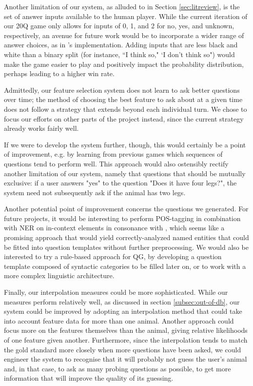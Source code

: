 \documentclass[11pt,a4paper]{article}
\begin{document}
Another limitation of our system, as alluded to in Section \ref{sec:litreview}, is the set of answer inputs available to the human player. While the current iteration of our 20Q game only allows for inputs of 0, 1, and 2 for no, yes, and unknown, respectively, an avenue for future work would be to incorporate a wider range of answer choices, as in \citet{Burgener2006}'s implementation. Adding inputs that are less black and white than a binary split (for instance, ``I think so," `I don't think so") would make the game easier to play and positively impact the probability distribution, perhaps leading to a higher win rate. 

Admittedly, our feature selection system does not learn to ask better questions over time; the method of choosing the best feature to ask about at a given time does not follow a strategy that extends beyond each individual turn. We chose to focus our efforts on other parts of the project instead, since the current strategy already works fairly well.

If we were to develop the system further, though, this would certainly be a point of improvement, e.g. by learning from previous games which sequences of questions tend to perform well. This approach would also ostensibly rectify another limitation of our system, namely that questions that should be mutually exclusive: if a user answers "yes" to the question "Does it have four legs?", the system need not subsequently ask if the animal has two legs. 

Another potential point of improvement concerns the questions we generated.
For future projects, it would be interesting to perform POS-tagging in combination with NER on in-context elements in consonance with \citet{Mandasari2019}, which seems like a promising approach that would yield correctly-analyzed named entities that could be fitted into question templates without further preprocessing. 
We would also be interested to try a rule-based approach for QG, by developing a question template composed of syntactic categories to be filled later on, or to work with a more complex linguistic architecture. 

Finally, our interpolation measures could be more sophisticated. While our measures perform relatively well, as discussed in section \ref{subsec:out-of-db}, our system could be improved by adopting an interpolation method that could take into account feature data for more than one animal. 
Another approach could focus more on the features themselves than the animal, giving relative likelihoods of one feature given another.
Furthermore, since the interpolation tends to match the gold standard more closely when more questions have been asked, we could engineer the system to recognise that it will probably not guess the user's animal and, in that case, to ask as many probing questions as possible, to get more information that will improve the quality of its guessing.
\end{document}
